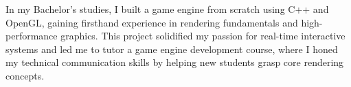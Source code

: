 In my Bachelor’s studies, I built a game engine from scratch using C++ and OpenGL, 
gaining firsthand experience in rendering fundamentals and high-performance graphics. 
This project solidified my passion for real-time interactive systems and 
led me to tutor a game engine development course, 
where I honed my technical communication skills by 
helping new students grasp core rendering concepts.